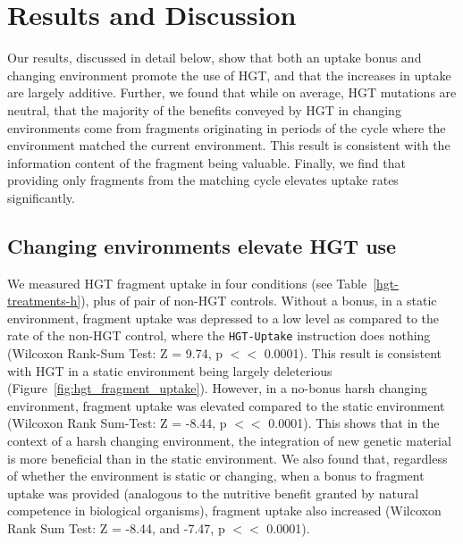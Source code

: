 \documentclass[letterpaper]{article}
\begin{document}
\section{Results and Discussion}

Our results, discussed in detail below, show that both an uptake bonus and changing environment promote the use of HGT, and that the increases in uptake are largely additive. Further, we found that while on average, HGT mutations are neutral, that the majority of the benefits conveyed by HGT in changing environments come from fragments originating in periods of the cycle where the environment matched the current environment. This result is consistent with the information content of the fragment being valuable. Finally, we find that providing only fragments from the matching cycle elevates uptake rates significantly.

\subsection{Changing environments elevate HGT use}

We measured HGT fragment uptake in four conditions (see Table~\ref{hgt-treatments-h}), plus of pair of non-HGT controls. Without a bonus, in a static environment, fragment uptake was depressed to a low level as compared to the rate of the non-HGT control, where the \texttt{HGT-Uptake} instruction does nothing (Wilcoxon Rank-Sum Test: Z = 9.74, p $<<$ 0.0001). This result is consistent with HGT in a static environment being largely deleterious (Figure~\ref{fig:hgt_fragment_uptake}). However, in a no-bonus harsh changing environment, fragment uptake was elevated compared to the static environment (Wilcoxon Rank Sum-Test: Z = -8.44, p $<<$ 0.0001). This shows that in the context of a harsh changing environment, the integration of new genetic material is more beneficial than in the static environment. We also found that, regardless of whether the environment is static or changing, when a bonus to fragment uptake was provided (analogous to the nutritive benefit granted by natural competence in biological organisms), fragment uptake also increased (Wilcoxon Rank Sum Test: Z = -8.44, and -7.47, p $<<$ 0.0001). 
\end{document}
